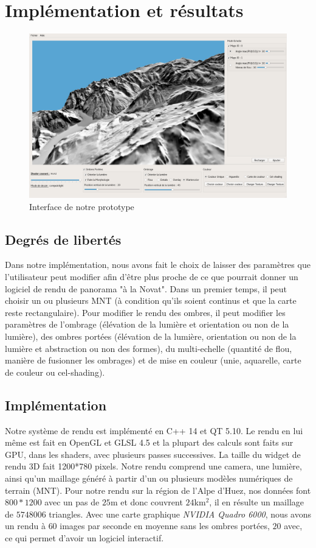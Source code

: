 \chapter{Implémentation et résultats}
\begin{figure}[h!]

   \centering
   \includegraphics[width=1.0\linewidth]{Resultats/interface.png}
   \caption{Interface de notre prototype}
\end{figure}

\section{Degrés de libertés}
Dans notre implémentation, nous avons fait le choix de laisser des paramètres que l'utilisateur peut modifier  afin d'être plus proche de ce que pourrait donner un logiciel de rendu de panorama "à la Novat". Dans un premier temps, il peut choisir un ou plusieurs MNT (à condition qu'ils soient continus et que la carte reste rectangulaire). Pour modifier le rendu des ombres, il peut modifier les paramètres de l'ombrage (élévation de la lumière et orientation ou non de la lumière), des ombres portées (élévation de la lumière, orientation ou non de la lumière et abstraction ou non des formes), du multi-echelle (quantité de flou, manière de fusionner les ombrages) et de mise en couleur (unie, aquarelle, carte de couleur ou cel-shading). 
\section{Implémentation}
Notre système de rendu est implémenté en C++ 14 et QT 5.10. Le rendu en lui même est fait en OpenGL et GLSL 4.5 et la plupart des calculs sont faits sur GPU, dans les shaders, avec plusieurs passes successives.  La taille du widget de rendu 3D fait 1200*780 pixels. Notre rendu comprend une camera, une lumière,  ainsi qu'un maillage généré à partir d'un ou plusieurs modèles numériques de terrain (MNT). Pour notre rendu sur la région de l'Alpe d'Huez, nos données font $800*1200$ avec un pas de $25$m et donc couvrent $24$km$^2$, il en résulte un maillage de $5748006$ triangles. Avec une carte graphique \textit{NVIDIA Quadro 6000}, nous avons un rendu à $60$ images par seconde en moyenne sans les ombres portées, $20$ avec, ce qui permet d'avoir un logiciel interactif.  

